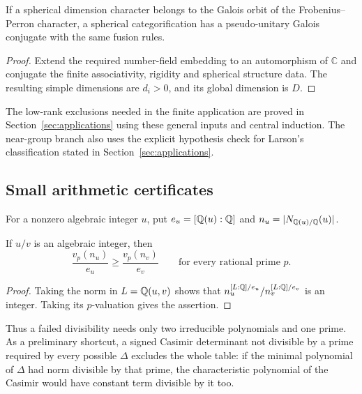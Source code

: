 \begin{lemma}\label{lem:galois}
If a spherical dimension character belongs to the Galois orbit of the
Frobenius--Perron character, a spherical categorification has a
pseudo-unitary Galois conjugate with the same fusion rules.
\end{lemma}
\begin{proof}
Extend the required number-field embedding to an automorphism of
$\mathbb C$ and conjugate the finite associativity, rigidity and spherical
structure data. The resulting simple dimensions are $d_i>0$, and its
global dimension is $D$.
\end{proof}

The low-rank exclusions needed in the finite application are proved in
Section~\ref{sec:applications} using these general inputs and central
induction. The near-group branch also uses the explicit hypothesis check for
Larson's classification stated in Section~\ref{sec:applications}.

\subsection{Small arithmetic certificates}
For a nonzero algebraic integer $u$, put
$e_u=[\mathbb Q(u):\mathbb Q]$ and $n_u=|N_{\mathbb Q(u)/\mathbb Q}(u)|$.
\begin{lemma}\label{lem:norm}
If $u/v$ is an algebraic integer, then
\begin{equation}\label{eq:norm}
 \frac{v_p(n_u)}{e_u}\geq\frac{v_p(n_v)}{e_v}
 \qquad\text{for every rational prime }p.
\end{equation}
\end{lemma}
\begin{proof}
Taking the norm in $L=\mathbb Q(u,v)$ shows that
$n_u^{[L:\mathbb Q]/e_u}/n_v^{[L:\mathbb Q]/e_v}$ is an integer. Taking its
$p$-valuation gives the assertion.
\end{proof}
Thus a failed divisibility needs only two irreducible polynomials and one
prime. As a preliminary shortcut, a signed Casimir determinant not divisible
by a prime required by every possible $\Delta$ excludes the whole table:
if the minimal polynomial of $\Delta$ had norm divisible by that prime,
the characteristic polynomial of the Casimir would have constant term
divisible by it too.


